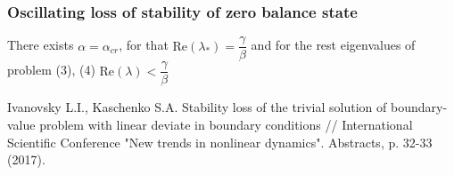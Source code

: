 \documentclass[fullscreen=true, unicode, bookmarks=false]{beamer}
\begin{document}
\begin{frame}
\frametitle{ Oscillating loss of stability of zero balance state }
	
\begin{theorem}
There exists $ \alpha=\alpha_{cr} $, for that $ \mbox{Re}(\lambda_{*}) = \dfrac{\gamma}{\beta} $ and for the rest eigenvalues of problem (3), (4) $ \mbox{Re}(\lambda) < \dfrac{\gamma}{\beta} $ 
\end{theorem}

\vspace{1.1cm}
\pause

\begin{exampleblock}{}
{\large Ivanovsky L.I., Kaschenko S.A. Stability loss of the trivial solution of boundary-value problem with linear deviate in boundary conditions // International Scientific Conference "New trends in nonlinear dynamics". Abstracts, p. 32-33 (2017). }
\end{exampleblock}
\end{frame}
\end{document}

